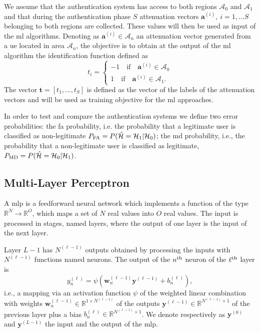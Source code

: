 \documentclass[twocolumns]{IEEEtran}
\begin{document}
We assume that the authentication system has access to both regions $\mathcal{A}_0$ and $\mathcal{A}_1$ and that during the authentication phase $S$ attenuation vectors $\bm{a}^{(i)}, \ i=1,\dots S$  belonging to both regions are collected. These values will then be used as input of the \ac{ml} algorithms. Denoting as $\bm{a}^{(i)}\in \mathcal{A}_n$ an attenuation vector generated from a \ac{ue} located in area $\mathcal{A}_{n}$, the objective is to obtain at the output of the \ac{ml} algorithm the identification function defined as
\begin{equation}
  t_i =
  \begin{cases}
  -1 \quad \text{if} \quad \bm{a}^{(i)} \in \mathcal{A}_0\\
  1 \quad \text{if} \quad \bm{a}^{(i)} \in \mathcal{A}_1.
  \end{cases}
\end{equation}
The vector $\bm{t}=[t_1,...,t_S]$ is defined as the vector of the labels of the attenuation vectors and will be used as training objective for the \ac{ml} approaches.

In order to test and compare the authentication systems we define two error probabilities: the \ac{fa} probability, i.e. the probability  that a legitimate user is classified as non-legitimate $P_{\rm FA} =P(\hat{\mathcal H} = \mathcal H_1 | \mathcal H_0)$; the \ac{md} probability, i.e., the probability that a non-legitimate user is classified as legitimate, $P_{\rm MD}=P(\hat{\mathcal H} = \mathcal H_0 | \mathcal H_1)$.

\subsection{Multi-Layer Perceptron}\label{sec:nn}

A \ac{mlp} is a feedforward neural network which implements a function of the type $\mathbb{R}^N \to \mathbb{R}^O$, which maps a set of $N$ real values into $O$ real values. The input is processed in stages, named layers, where the output of one layer is the input of the next layer.

Layer $L-1$ has $N^{(\ell-1)}$ outputs obtained by processing the inputs with $N^{(\ell-1)}$ functions named neurons. The output of the $n^{\rm th}$ neuron of the $\ell^{\rm th}$ layer is
\begin{equation}\label{eq:nonLin}
y_n^{(\ell)} = \psi\left( \bm{w}_n^{(\ell -1)}\bm{y}^{(\ell-1)}+b_n^{(\ell)} \right),
\end{equation}
i.e., a mapping via an activation function $\psi$ of the weighted linear combination with weights $\bm{w}_n^{(\ell -1)}\in \mathbb{R}^{1\times N^{(\ell-1)}}$ of the outputs $\bm{y}^{(\ell-1)} \in \mathbb{R}^{N^{(\ell-1)} \times 1 }$ of the previous layer plus a bias $b_n^{(\ell)} \in \mathbb{R}^{N^{(\ell-1)} \times 1 }$. We denote respectively as $\bm{y}^{(0)}$ and $\bm{y}^{(L-1)}$ the input and the output of the \ac{mlp}. 
\end{document}
